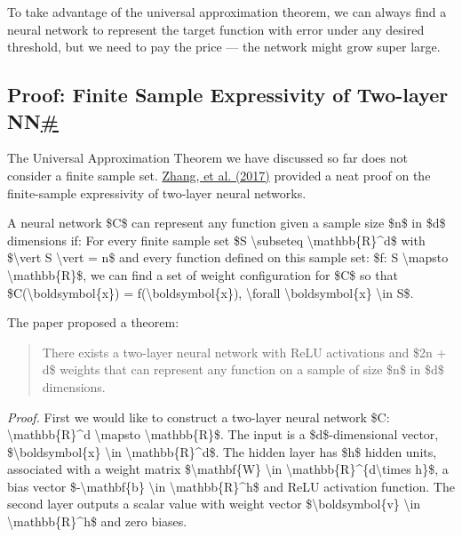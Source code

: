 To take advantage of the universal approximation theorem, we can always find a neural network to represent the target function with error under any desired threshold, but we need to pay the price --- the network might grow super large.

\subsection{\texorpdfstring{Proof: Finite Sample Expressivity of Two-layer NN\hyperref[proof-finite-sample-expressivity-of-two-layer-nn]{\#}}{Proof: Finite Sample Expressivity of Two-layer NN\#}}\label{proof-finite-sample-expressivity-of-two-layer-nn}

The Universal Approximation Theorem we have discussed so far does not consider a finite sample set. \href{https://arxiv.org/abs/1611.03530}{Zhang, et al. (2017)} provided a neat proof on the finite-sample expressivity of two-layer neural networks.

A neural network \$C\$ can represent any function given a sample size \$n\$ in \$d\$ dimensions if: For every finite sample set \$S \textbackslash subseteq \textbackslash mathbb\{R\}\^{}d\$ with \$\textbackslash vert S \textbackslash vert = n\$ and every function defined on this sample set: \$f: S \textbackslash mapsto \textbackslash mathbb\{R\}\$, we can find a set of weight configuration for \$C\$ so that \$C(\textbackslash boldsymbol\{x\}) = f(\textbackslash boldsymbol\{x\}), \textbackslash forall \textbackslash boldsymbol\{x\} \textbackslash in S\$.

The paper proposed a theorem:

\begin{quote}
There exists a two-layer neural network with ReLU activations and \$2n + d\$ weights that can represent any function on a sample of size \$n\$ in \$d\$ dimensions.
\end{quote}

\emph{Proof.} First we would like to construct a two-layer neural network \$C: \textbackslash mathbb\{R\}\^{}d \textbackslash mapsto \textbackslash mathbb\{R\}\$. The input is a \$d\$-dimensional vector, \$\textbackslash boldsymbol\{x\} \textbackslash in \textbackslash mathbb\{R\}\^{}d\$. The hidden layer has \$h\$ hidden units, associated with a weight matrix \$\textbackslash mathbf\{W\} \textbackslash in \textbackslash mathbb\{R\}\^{}\{d\textbackslash times h\}\$, a bias vector \$-\textbackslash mathbf\{b\} \textbackslash in \textbackslash mathbb\{R\}\^{}h\$ and ReLU activation function. The second layer outputs a scalar value with weight vector \$\textbackslash boldsymbol\{v\} \textbackslash in \textbackslash mathbb\{R\}\^{}h\$ and zero biases.

